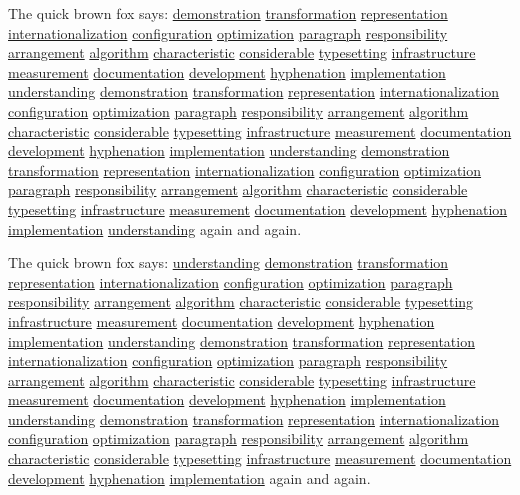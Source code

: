 \documentclass{article}
\begin{document}
The quick brown fox says: \underline{demonstration} \underline{transformation} \underline{representation} \underline{internationalization} \underline{configuration} \underline{optimization} \underline{paragraph} \underline{responsibility} \underline{arrangement} \underline{algorithm} \underline{characteristic} \underline{considerable} \underline{typesetting} \underline{infrastructure} \underline{measurement} \underline{documentation} \underline{development} \underline{hyphenation} \underline{implementation} \underline{understanding} \underline{demonstration} \underline{transformation} \underline{representation} \underline{internationalization} \underline{configuration} \underline{optimization} \underline{paragraph} \underline{responsibility} \underline{arrangement} \underline{algorithm} \underline{characteristic} \underline{considerable} \underline{typesetting} \underline{infrastructure} \underline{measurement} \underline{documentation} \underline{development} \underline{hyphenation} \underline{implementation} \underline{understanding} \underline{demonstration} \underline{transformation} \underline{representation} \underline{internationalization} \underline{configuration} \underline{optimization} \underline{paragraph} \underline{responsibility} \underline{arrangement} \underline{algorithm} \underline{characteristic} \underline{considerable} \underline{typesetting} \underline{infrastructure} \underline{measurement} \underline{documentation} \underline{development} \underline{hyphenation} \underline{implementation} \underline{understanding} again and again.

The quick brown fox says: \underline{understanding} \underline{demonstration} \underline{transformation} \underline{representation} \underline{internationalization} \underline{configuration} \underline{optimization} \underline{paragraph} \underline{responsibility} \underline{arrangement} \underline{algorithm} \underline{characteristic} \underline{considerable} \underline{typesetting} \underline{infrastructure} \underline{measurement} \underline{documentation} \underline{development} \underline{hyphenation} \underline{implementation} \underline{understanding} \underline{demonstration} \underline{transformation} \underline{representation} \underline{internationalization} \underline{configuration} \underline{optimization} \underline{paragraph} \underline{responsibility} \underline{arrangement} \underline{algorithm} \underline{characteristic} \underline{considerable} \underline{typesetting} \underline{infrastructure} \underline{measurement} \underline{documentation} \underline{development} \underline{hyphenation} \underline{implementation} \underline{understanding} \underline{demonstration} \underline{transformation} \underline{representation} \underline{internationalization} \underline{configuration} \underline{optimization} \underline{paragraph} \underline{responsibility} \underline{arrangement} \underline{algorithm} \underline{characteristic} \underline{considerable} \underline{typesetting} \underline{infrastructure} \underline{measurement} \underline{documentation} \underline{development} \underline{hyphenation} \underline{implementation} again and again.
\end{document}
